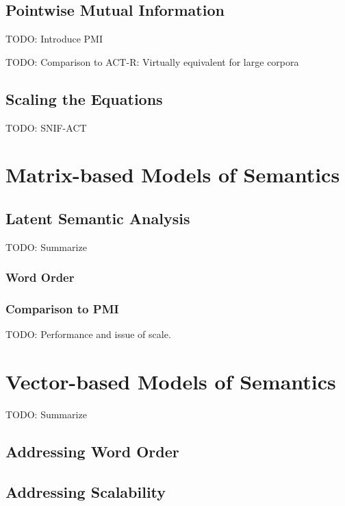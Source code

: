 \documentclass[man]{apa6}
\begin{document}
\subsection{Pointwise Mutual Information}

TODO: Introduce PMI \cite{Farahat2004}

TODO: Comparison to ACT-R: Virtually equivalent for large corpora \cite{Farahat2004}

\subsection{Scaling the Equations}

\cite{Douglass2010}

TODO: SNIF-ACT \cite{Fu2007} \cite{Pirolli2003}

\section{Matrix-based Models of Semantics}

\subsection{Latent Semantic Analysis}

TODO: Summarize \cite{Landauer1997}

\subsubsection{Word Order}

\subsubsection{Comparison to PMI}

TODO: Performance and issue of scale. \cite{Budiu2007}

\section{Vector-based Models of Semantics}

TODO: Summarize \cite{Plate1995}

\subsection{Addressing Word Order}

\subsection{Addressing Scalability}
\end{document}
